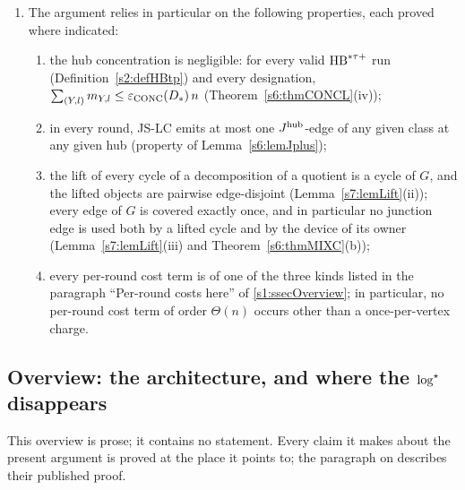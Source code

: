 \begin{remark}
\begin{enumerate}
\item[(ii)] The argument relies in particular on the following properties, each
proved where indicated:
\begin{enumerate}
\item[(1)] the hub concentration is negligible: for every valid $\mathrm{HB}^{*\tau{+}}$ run
(Definition~\ref{s2:defHBtp}) and every designation,
$\sum_{(Y,l)}m_{Y,l}\le\varepsilon_{\mathrm{CONC}}(D_{*})\,n$ (Theorem~\ref{s6:thmCONCL}(iv));
\item[(2)] in every round, JS-LC emits at most one $J^{\mathrm{hub}}$-edge of any given class at
any given hub (property  of Lemma~\ref{s6:lemJplus});
\item[(3)] the lift of every cycle of a decomposition of a quotient is a cycle
of $G$, and the lifted objects are pairwise edge-disjoint
(Lemma~\ref{s7:lemLift}(ii)); every edge of $G$ is covered exactly once, and in
particular no junction edge is used both by a lifted cycle and by the device of
its owner (Lemma~\ref{s7:lemLift}(iii) and Theorem~\ref{s6:thmMIXC}(b));
\item[(4)] every per-round cost term is of one of the three kinds listed in the
paragraph ``Per-round costs here'' of \ref{s1:ssecOverview}; in particular, no
per-round cost term of order $\Theta(n)$ occurs other than a once-per-vertex
charge.
\end{enumerate}
\end{enumerate}
\end{remark}

\subsection*{Overview: the architecture, and where the $\log^{\star}$ disappears}

This overview is prose; it contains no statement. Every claim it makes about the
present argument is proved at the place it points
to; the paragraph on \cite{BM} describes their published proof.

